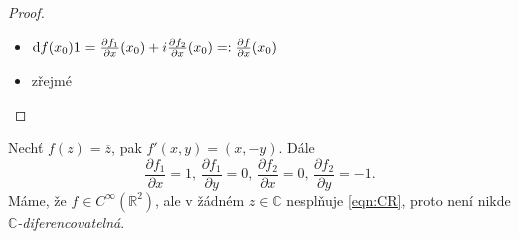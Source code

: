 \begin{proof}\mbox{}
\begin{itemize}
    \item $\mathop{}\!\mathrm{d} f(x_0)1 = \frac{\partial f_1}{\partial x}(x_0) + i\frac{\partial f_2}{\partial x}(x_0) =: \frac{\partial f}{\partial x}(x_0)$
    \item zřejmé
\end{itemize}
\end{proof}

\begin{example}
Nechť $f(z) = \overline{z}$, pak $f'(x,y) = (x,-y)$. Dále 
$$\frac{\partial f_1}{\partial x} = 1\text{, } \frac{\partial f_1}{\partial y} = 0\text{, } \frac{\partial f_2}{\partial x} = 0\text{, } \frac{\partial f_2}{\partial y} = -1\text{.}$$
Máme, že $f\in C^\infty(\mathbb{R}^2)$, ale v žádném $z\in \mathbb{C}$ nesplňuje \cref{eqn:CR}, proto není nikde\\ $\mathbb{C}$\emph{-diferencovatelná}.
\end{example}

